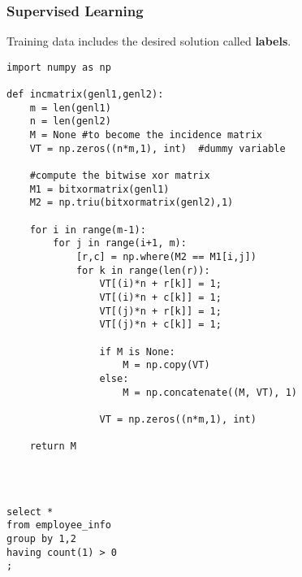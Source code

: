 \documentclass{article}
\begin{document}
\subsubsection{Supervised Learning}
Training data includes the desired solution called \textbf{labels}.
\begin{verbatim}
import numpy as np
    
def incmatrix(genl1,genl2):
    m = len(genl1)
    n = len(genl2)
    M = None #to become the incidence matrix
    VT = np.zeros((n*m,1), int)  #dummy variable
    
    #compute the bitwise xor matrix
    M1 = bitxormatrix(genl1)
    M2 = np.triu(bitxormatrix(genl2),1) 

    for i in range(m-1):
        for j in range(i+1, m):
            [r,c] = np.where(M2 == M1[i,j])
            for k in range(len(r)):
                VT[(i)*n + r[k]] = 1;
                VT[(i)*n + c[k]] = 1;
                VT[(j)*n + r[k]] = 1;
                VT[(j)*n + c[k]] = 1;
                
                if M is None:
                    M = np.copy(VT)
                else:
                    M = np.concatenate((M, VT), 1)
                
                VT = np.zeros((n*m,1), int)
    
    return M
\end{verbatim}

\begin{verbatim}



select * 
from employee_info
group by 1,2
having count(1) > 0
;



\end{verbatim}
\end{document}
